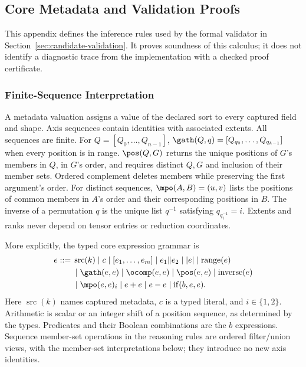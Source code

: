 \subsection{Core Metadata and Validation Proofs}
\label{app:validation-proofs}
This appendix defines the inference rules used by the formal validator in
Section~\ref{sec:candidate-validation}. It proves soundness of this calculus;
it does not identify a diagnostic trace from the implementation with a
checked proof certificate.

\subsubsection{Finite-Sequence Interpretation}
A metadata valuation assigns a value of the declared sort to every captured
field and shape. Axis sequences contain identities with associated extents.
All sequences are finite. For $Q=[Q_0,\ldots,Q_{n-1}]$,
$\gath(Q,q)=[Q_{q_0},\ldots,Q_{q_{k-1}}]$ when every position is in range.
$\pos(Q,G)$ returns the unique positions of $G$'s members in $Q$, in $G$'s
order, and requires distinct $Q,G$ and inclusion of their member sets.
Ordered complement deletes members while preserving the first argument's
order. For distinct sequences, $\mpo(A,B)=(u,v)$ lists the positions of
common members in $A$'s order and their corresponding positions in $B$.
The inverse of a permutation $q$ is the unique list $q^{-1}$ satisfying
$q_{q^{-1}_i}=i$. Extents and ranks never depend on tensor entries or
reduction coordinates.

More explicitly, the typed core expression grammar is
\begin{equation}
\begin{aligned}
 e::={}&\operatorname{src}(k)\mid c\mid[e_1,\ldots,e_m]
       \mid e_1\Vert e_2\mid |e|\mid\operatorname{range}(e)\\
      &\mid\gath(e,e)\mid\ocomp(e,e)\mid\pos(e,e)
       \mid\operatorname{inverse}(e)\\
      &\mid\mpo(e,e)_i\mid e+e\mid e-e
       \mid\operatorname{if}(b,e,e).
\end{aligned}
\end{equation}
Here $\operatorname{src}(k)$ names captured metadata, $c$ is a typed
literal, and $i\in\{1,2\}$. Arithmetic is scalar or an integer shift of a
position sequence, as determined by the types. Predicates and their Boolean
combinations are the $b$ expressions. Sequence member-set operations in
the reasoning rules are ordered filter/union views, with the member-set
interpretations below; they introduce no new axis identities.

